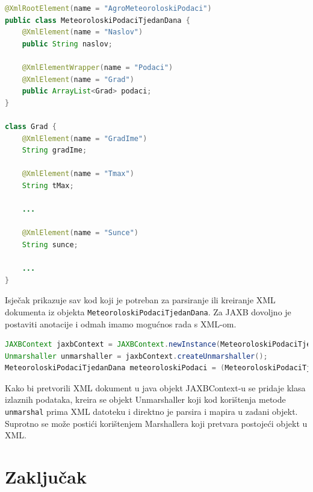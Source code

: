 \documentclass[]{foi}
\begin{document}
\begin{lstlisting}[language=java, caption={Primjer JAXB anotacija na klasama}]
@XmlRootElement(name = "AgroMeteoroloskiPodaci")
public class MeteoroloskiPodaciTjedanDana {
    @XmlElement(name = "Naslov")
    public String naslov;

    @XmlElementWrapper(name = "Podaci")
    @XmlElement(name = "Grad")
    public ArrayList<Grad> podaci;
}

class Grad {
    @XmlElement(name = "GradIme")
    String gradIme;

    @XmlElement(name = "Tmax")
    String tMax;

    ...

    @XmlElement(name = "Sunce")
    String sunce;

    ...
}
\end{lstlisting}

Isječak prikazuje sav kod koji je potreban za parsiranje ili kreiranje XML dokumenta iz
objekta \texttt{MeteoroloskiPodaciTjedanDana}. Za JAXB dovoljno je postaviti anotacije
i odmah imamo mogućnos rada s XML-om.

\begin{lstlisting}[language=java, caption={Pretvaranje XML dokumenta u Java objekte korištenjem JAXB}]
JAXBContext jaxbContext = JAXBContext.newInstance(MeteoroloskiPodaciTjedanDana.class);
Unmarshaller unmarshaller = jaxbContext.createUnmarshaller();
MeteoroloskiPodaciTjedanDana meteoroloskiPodaci = (MeteoroloskiPodaciTjedanDana) unmarshaller.unmarshal(DemoDatoteke.demoSedmodnevniPodaciXML());
\end{lstlisting}

Kako bi pretvorili XML dokument u java objekt JAXBContext-u se pridaje klasa izlaznih
podataka, kreira se objekt Unmarshaller koji kod korištenja metode \texttt{unmarshal}
prima XML datoteku i direktno je parsira i mapira u zadani objekt.
Suprotno se može postići korištenjem Marshallera koji pretvara postojeći objekt u XML.

\chapter{Zaključak}

\makebackmatter
\end{document}

